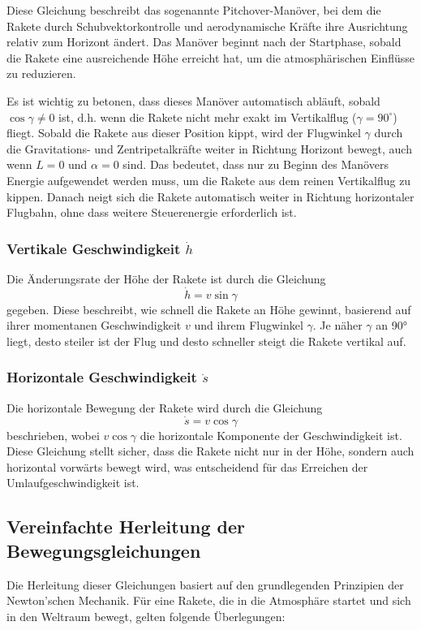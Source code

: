 Diese Gleichung beschreibt das sogenannte Pitchover-Manöver, bei dem die Rakete durch Schubvektorkontrolle und aerodynamische Kräfte ihre Ausrichtung relativ zum Horizont ändert. 
Das Manöver beginnt nach der Startphase, sobald die Rakete eine ausreichende Höhe erreicht hat, um die atmosphärischen Einflüsse zu reduzieren.

Es ist wichtig zu betonen, dass dieses Manöver automatisch abläuft, sobald \(\cos \gamma \neq 0\) ist, d.h. wenn die Rakete nicht mehr exakt im Vertikalflug (\(\gamma = 90^\circ\)) fliegt. 
Sobald die Rakete aus dieser Position kippt, wird der Flugwinkel \(\gamma\) durch die Gravitations- und Zentripetalkräfte weiter in Richtung Horizont bewegt, auch wenn \(L = 0\) und \( \alpha = 0\) sind. 
Das bedeutet, dass nur zu Beginn des Manövers Energie aufgewendet werden muss, um die Rakete aus dem reinen Vertikalflug zu kippen. 
Danach neigt sich die Rakete automatisch weiter in Richtung horizontaler Flugbahn, ohne dass weitere Steuerenergie erforderlich ist.


\subsubsection{Vertikale Geschwindigkeit \(\dot{h}\)}
Die Änderungsrate der Höhe der Rakete ist durch die Gleichung
\[
\dot{h} = v \sin \gamma
\]
gegeben. 
Diese beschreibt, wie schnell die Rakete an Höhe gewinnt, basierend auf ihrer momentanen Geschwindigkeit \(v\) und ihrem Flugwinkel \(\gamma\). 
Je näher \(\gamma\) an 90° liegt, desto steiler ist der Flug und desto schneller steigt die Rakete vertikal auf.

\subsubsection{Horizontale Geschwindigkeit \(\dot{s}\)}
Die horizontale Bewegung der Rakete wird durch die Gleichung
\[
\dot{s} = v \cos \gamma
\]
beschrieben, wobei \(v \cos \gamma\) die horizontale Komponente der Geschwindigkeit ist. 
Diese Gleichung stellt sicher, dass die Rakete nicht nur in der Höhe, sondern auch horizontal vorwärts bewegt wird, was entscheidend für das Erreichen der Umlaufgeschwindigkeit ist.

\subsection{Vereinfachte Herleitung der Bewegungsgleichungen}
Die Herleitung dieser Gleichungen basiert auf den grundlegenden Prinzipien der Newton'schen Mechanik. Für eine Rakete, die in die Atmosphäre startet und sich in den Weltraum bewegt, gelten folgende Überlegungen:

